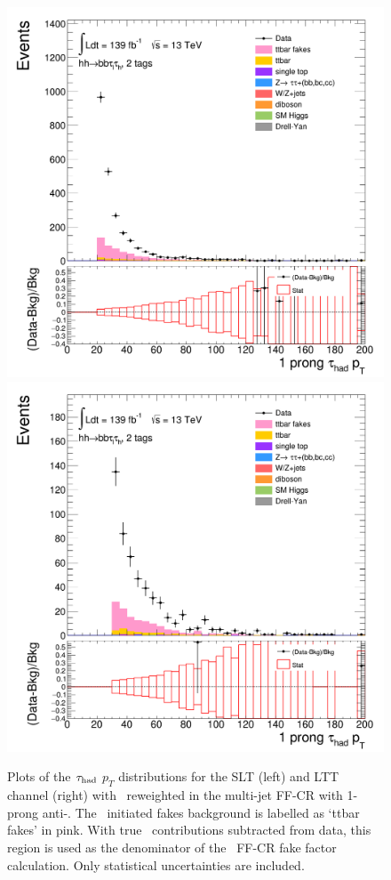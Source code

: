\begin{figure}[htbp]
\centering
\includegraphics[width=.45\textwidth]{DiHiggs/plots/FF_CRs/InvCR_SLT/HNone/BDTVarsHighMbb/2/C_2tag2pjet_0ptv_TauPt1P.png}
\includegraphics[width=.45\textwidth]{DiHiggs/plots/FF_CRs/InvCR_LTT/HNone/BDTVarsHighMbb/2/C_2tag2pjet_0ptv_TauPt1P.png}\\
\caption{Plots of the $\tau_{\mathrm{had}}$ $p_T$ distributions for the SLT (left) and LTT channel (right) with \ttbar\ reweighted 
in the multi-jet FF-CR with 1-prong anti-\tauhad. 
The \ttbar\ initiated fakes background is labelled as `ttbar fakes' in pink.
With true \tauhad\ contributions subtracted from data, 
this region is used as the denominator of the \ttbar\ FF-CR fake factor calculation. 
Only statistical uncertainties are included.}
\label{fig:InvCR_1}
\end{figure} 

